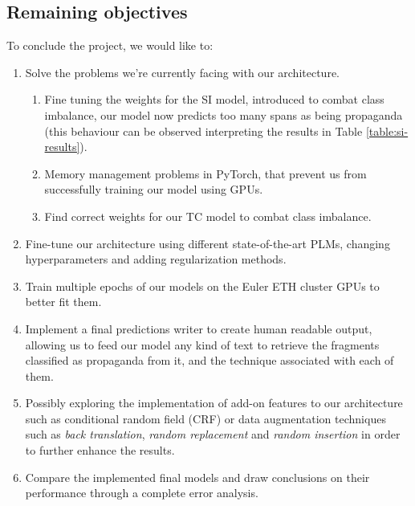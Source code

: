 \documentclass[11pt]{article}
\newcommand{\pol}[1]{{\fontfamily{pcr}\selectfont#1}}
\begin{document}
\subsection*{Remaining objectives}
To conclude the project, we would like to:
\begin{enumerate}
    \item Solve the problems we're currently facing with our architecture. 
    \begin{enumerate}
        \item Fine tuning the weights for the \pol{SI} model, introduced to combat class imbalance, our model now predicts too many spans as being propaganda (this behaviour can be observed interpreting the results in Table \ref{table:si-results}).
        \item Memory management problems in PyTorch, that prevent us from successfully training our model using GPUs.
        \item Find correct weights for our \pol{TC} model to combat class imbalance.
    \end{enumerate}
    \item Fine-tune our architecture using different state-of-the-art \pol{PLM}s, changing hyperparameters and adding regularization methods.
    \item Train multiple epochs of our models on the Euler ETH cluster GPUs to better fit them.
    \item Implement a final predictions writer to create human readable output, allowing us to feed our model any kind of text to retrieve the fragments classified as propaganda from it, and the technique associated with each of them.
    \item Possibly exploring the implementation of add-on features to our architecture such as conditional random field (\pol{CRF}) or data augmentation techniques such as \textit{back translation}, \textit{random replacement} and \textit{random insertion} in order to further enhance the results.
    \item Compare the implemented final models and draw conclusions on their performance through a complete error analysis.
\end{enumerate}
\end{document}
